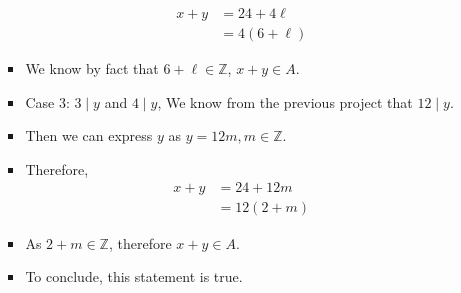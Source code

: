 \documentclass[letterpaper,12pt]{article}
\begin{document}
\begin{enumerate}
\begin{itemize}
\begin{itemize}
	\begin{align}
	x+y &= 24+4\ell \\ &=4(6+\ell)	
	\end{align}
	\item We know by fact that $6+\ell \in \mathbb{Z}$, $x+y \in A$.
	\item Case 3: $3\mid y $ and $4\mid y$, We know from the previous project that $12 \mid y$.
	\item Then we can express $y$ as $y=12m, m \in \mathbb{Z}$.
	\item Therefore,
	\begin{align}
	x+y &= 24+12m	\\ &= 12(2+m)
	\end{align}
	\item As $2+m \in \mathbb{Z}$, therefore $x+y \in A$.
	\item To conclude, this statement is true.

\end{itemize}
	

\end{itemize}
\end{enumerate}
\end{document}
